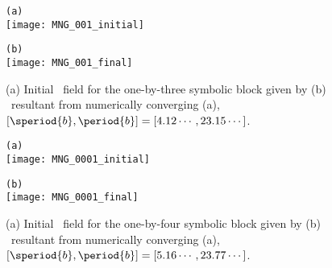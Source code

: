 \begin{figure}
\begin{minipage}[height=.4\textheight]{.5\textwidth}
\centering \small{\texttt{(a)}}\\
\texttt{[image: MNG\_001\_initial]}
\end{minipage}
\begin{minipage}[height=.4\textheight]{.5\textwidth}
\centering \small{\texttt{(b)}}\\
\texttt{[image: MNG\_001\_final]}
\end{minipage}
\caption{ \label{fig:block001}
(a) Initial \spt\ field for the one-by-three symbolic block given by 
(b) \twoT\ resultant from numerically converging (a),
$[\speriod{b},\period{b}]=[4.12\cdots,23.15\cdots ]$.
}
\end{figure}

\begin{figure}
\begin{minipage}[height=.4\textheight]{.45\textwidth}
\centering \small{\texttt{(a)}}\\
\texttt{[image: MNG\_0001\_initial]}
\end{minipage}
\begin{minipage}[height=.4\textheight]{.45\textwidth}
\centering \small{\texttt{(b)}}\\
\texttt{[image: MNG\_0001\_final]}
\end{minipage}
\caption{ \label{fig:block0001}
(a) Initial \spt\ field for the one-by-four symbolic block given by 
(b) \twoT\ resultant from numerically converging (a),
$[\speriod{b},\period{b}]=[5.16\cdots,23.77\cdots]$.
}
\end{figure}

